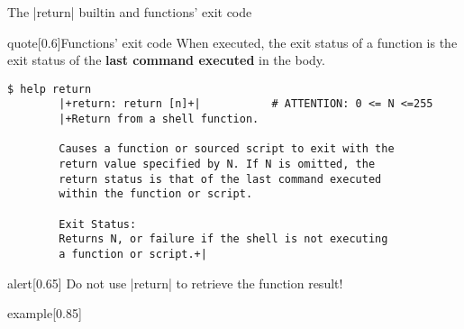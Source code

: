 \begin{frame}[fragile]{The \bash|return| builtin and functions' exit code}
    \vspace{-4mm}
    \begin{varblock}{quote}[0.6\textwidth]{Functions' exit code}
        \textnormal{When executed, the exit status of a function is the exit status of the \textbf{last command executed} in the body.}
    \end{varblock}
    \begin{lstlisting}[style=MyBash, numbers=none, belowskip=-6mm]
        $ help return
        |+return: return [n]+|           # ATTENTION: 0 <= N <=255
        |+Return from a shell function.

        Causes a function or sourced script to exit with the
        return value specified by N. If N is omitted, the
        return status is that of the last command executed
        within the function or script.

        Exit Status:
        Returns N, or failure if the shell is not executing
        a function or script.+|
    \end{lstlisting}
    \medskip
    \begin{varblock}{alert}[0.65\textwidth]{}
        \large \alert{Do not use \bash|return| to retrieve the function result!}
    \end{varblock}
    \vspace{-1mm}
    \begin{varblock}{example}[0.85\textwidth]{}
    \end{varblock}
\end{frame}
